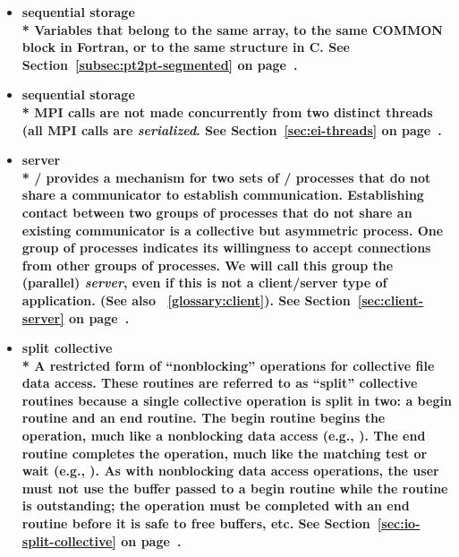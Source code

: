 \begin{itemize}
\label{glossary:sequential_storage}
\item \bf{ sequential storage} \\*
Variables that belong to the same array,
to the same {\sf COMMON} block in Fortran, or to the same structure in C.
See Section~\ref{subsec:pt2pt-segmented} on page~\pageref{subsec:pt2pt-segmented}.

\label{glossary:serialized}
\item \bf{ sequential storage} \\* 
MPI calls are not made concurrently from two distinct threads (all MPI calls are \emph{serialized}.
See Section~\ref{sec:ei-threads} on page~\pageref{sec:ei-threads}.


\label{glossary:server}
\item \bf{ server} \\*
 \MPI/ provides a mechanism for two sets of \MPI/  processes that do not share a communicator
to establish communication.
Establishing contact between two groups of processes that do not share an
existing communicator is a collective but asymmetric process.  One group of
processes indicates its willingness to accept connections from other groups of
processes.  We will call this group the (parallel) \emph{server}, even if this
is not a client/server type of application.  
(See also ~\ref{glossary:client}). 
See Section~\ref{sec:client-server} on page~\pageref{sec:client-server}.

\label{glossary:split_collective}
\item \bf{ split collective} \\* 
A restricted form of ``nonblocking'' operations
for collective file data access.
These routines are referred to as ``split'' collective routines
because a single collective operation is split in two:
a begin routine and an end routine.
The begin routine begins the operation,
much like a nonblocking data access (e.g., ).
The end routine completes the operation,
much like the matching test or wait (e.g., ).
As with nonblocking data access operations,
the user must not use the buffer
passed to a begin routine while the routine is outstanding;
the operation must be completed with an end routine before it
is safe to free buffers, etc.
See Section~\ref{sec:io-split-collective} on page~\pageref{sec:io-split-collective}.


\end{itemize}
